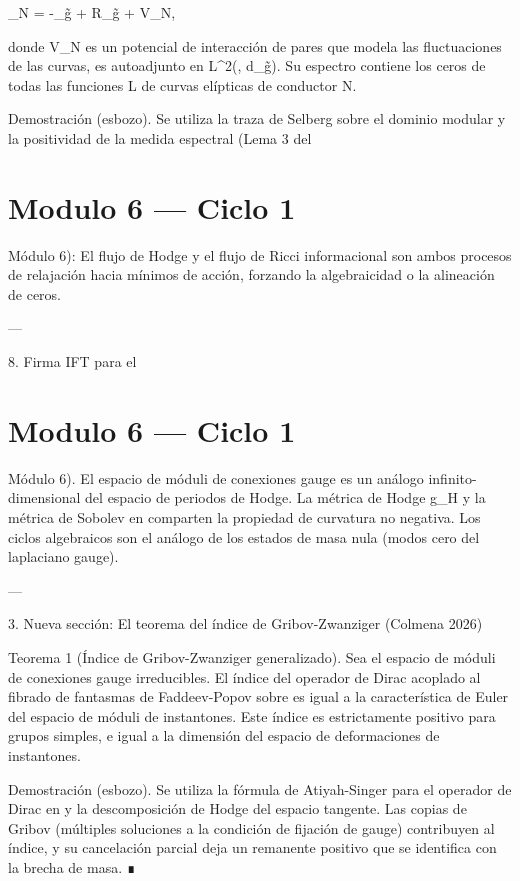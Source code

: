 \documentclass[12pt,twoside]{book}
\begin{document}
_N = -\Delta_{g̃} +  R_{g̃} + V_N,

donde V_N es un potencial de interacción de pares que modela las fluctuaciones de las curvas, es autoadjunto en L^2(, \rho d_{g̃}). Su espectro contiene los ceros de todas las funciones L de curvas elípticas de conductor N.

Demostración (esbozo). Se utiliza la traza de Selberg sobre el dominio modular y la positividad de la medida espectral (Lema 3 del 

\chapter{Modulo 6 — Ciclo 1}
Módulo 6): El flujo de Hodge y el flujo de Ricci informacional son ambos procesos de relajación hacia mínimos de acción, forzando la algebraicidad o la alineación de ceros.

---

8. Firma IFT para el 

\chapter{Modulo 6 — Ciclo 1}
Módulo 6).
El espacio de móduli de conexiones gauge es un análogo infinito-dimensional del espacio de periodos de Hodge. La métrica de Hodge g_H y la métrica de Sobolev en  comparten la propiedad de curvatura no negativa. Los ciclos algebraicos son el análogo de los estados de masa nula (modos cero del laplaciano gauge).

---

3. Nueva sección: El teorema del índice de Gribov-Zwanziger (Colmena 2026)

Teorema 1 (Índice de Gribov-Zwanziger generalizado). Sea  el espacio de móduli de conexiones gauge irreducibles. El índice del operador de Dirac acoplado al fibrado de fantasmas de Faddeev-Popov sobre  es igual a la característica de Euler del espacio de móduli de instantones. Este índice es estrictamente positivo para grupos simples, e igual a la dimensión del espacio de deformaciones de instantones.

Demostración (esbozo). Se utiliza la fórmula de Atiyah-Singer para el operador de Dirac en  y la descomposición de Hodge del espacio tangente. Las copias de Gribov (múltiples soluciones a la condición de fijación de gauge) contribuyen al índice, y su cancelación parcial deja un remanente positivo que se identifica con la brecha de masa. ∎
\end{document}
